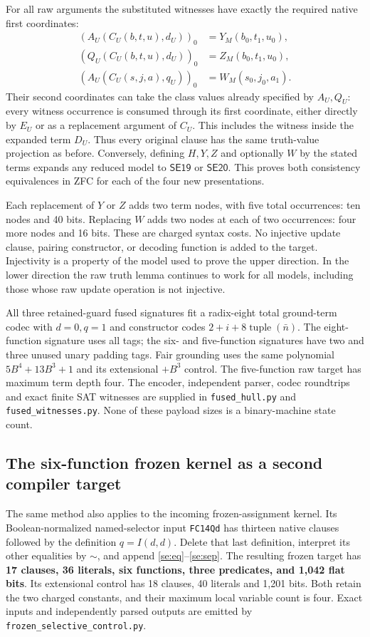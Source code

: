 For all raw arguments the substituted witnesses have exactly the
required native first coordinates:
\begin{align*}
 (A_U(C_U(b,t,u),d_U))_0&=Y_M(b_0,t_1,u_0),\\
 (Q_U(C_U(b,t,u),d_U))_0&=Z_M(b_0,t_1,u_0),\\
 (A_U(C_U(s,j,a),q_U))_0&=W_M(s_0,j_0,a_1).
\end{align*}
Their second coordinates can take the class values already specified
by $A_U,Q_U$: every witness occurrence is consumed through its first
coordinate, either directly by $E_U$ or as a replacement argument of
$C_U$. This includes the witness inside the expanded term $D_U$.
Thus every original clause has the same truth-value projection as
before. Conversely, defining $H,Y,Z$ and optionally $W$ by the stated
terms expands any reduced model to $\mathsf{SE19}$ or
$\mathsf{SE20}$. This proves both consistency equivalences in ZFC
for each of the four new presentations.

Each replacement of $Y$ or $Z$ adds two term nodes, with five total
occurrences: ten nodes and 40 bits. Replacing $W$ adds two nodes at
each of two occurrences: four more nodes and 16 bits. These are
charged syntax costs. No injective update clause, pairing constructor,
or decoding function is added to the target. Injectivity is a property
of the model used to prove the upper direction. In the lower direction
the raw truth lemma continues to work for all models, including those
whose raw update operation is not injective.

All three retained-guard fused signatures fit a radix-eight total
ground-term codec with $d=0,q=1$ and constructor codes
$2+i+8\operatorname{tuple}(\bar n)$. The eight-function signature uses
all tags; the six- and five-function signatures have two and three
unused unary padding tags. Fair grounding uses the same polynomial
$5B^4+13B^3+1$ and its extensional $+B^3$ control. The five-function
raw target has maximum term depth four. The encoder, independent
parser, codec roundtrips and exact finite SAT witnesses are supplied
in \texttt{fused\_hull.py} and \texttt{fused\_witnesses.py}.
None of these payload sizes is a binary-machine state count.

\subsection{The six-function frozen kernel as a second compiler target}

The same method also applies to the incoming frozen-assignment kernel.
Its Boolean-normalized named-selector input \texttt{FC14Qd} has thirteen
native clauses followed by the definition $q=I(d,d)$. Delete that last
definition, interpret its other equalities by $\sim$, and append
\eqref{se:eq}--\eqref{se:sep}. The resulting frozen target has
\textbf{17 clauses, 36 literals, six functions, three predicates,
and 1,042 flat bits}. Its extensional control has 18 clauses,
40 literals and 1,201 bits. Both retain the two charged constants,
and their maximum local variable count is four. Exact inputs and
independently parsed outputs are emitted by
\texttt{frozen\_selective\_control.py}.

